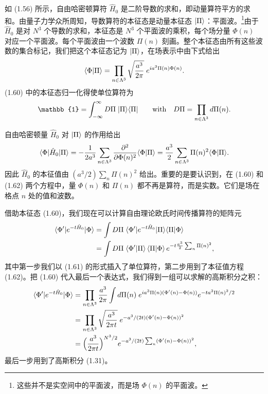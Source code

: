 如 (1.56) 所示，自由哈密顿算符 $\hat{H}_0$ 是二阶导数的求和，即动量算符平方的求和。由量子力学众所周知，导数算符的本征态是动量本征态 $|\Pi\rangle$：平面波。\footnote{这些并不是实空间中的平面波，而是场 $\Phi(n)$ 的平面波。}由于 $\hat{H}_0$ 是对 $N^3$ 个导数的求和，本征态是 $N^3$ 个平面波的乘积，每个场分量 $\Phi(n)$ 对应一个平面波。每个平面波由一个波数 $\Pi(n)$ 刻画。整个本征态由所有这些波数的集合标记，我们把这个本征态记为 $|\Pi\rangle$，在场表示中由下式给出
\begin{equation}
  \langle\Phi|\Pi\rangle
  = \prod_{n\in\Lambda^3}\sqrt{\frac{a^3}{2\pi}}\;e^{i a^3\Pi(n)\Phi(n)}.
\end{equation}
(1.60) 中的本征态归一化得使单位算符为
\begin{equation}
  \mathbb{1} = \int_{-\infty}^{\infty}D\Pi\;\ket{\Pi}\bra{\Pi}
  \qquad \text{with} \quad D\Pi = \prod_{n\in\Lambda^3}d\Pi(n).
\end{equation}

自由哈密顿量 $\hat{H}_0$ 对 $|\Pi\rangle$ 的作用给出
\begin{equation}
  \langle\Phi|\hat{H}_0|\Pi\rangle
  = -\frac{1}{2a^3}\sum_{n\in\Lambda^3}
    \frac{\partial^2}{\partial\Phi(n)^2}\langle\Phi|\Pi\rangle
  = \frac{a^3}{2}\sum_{n\in\Lambda^3}\Pi(n)^2\langle\Phi|\Pi\rangle.
\end{equation}
因此 $\hat{H}_0$ 的本征值由 $(a^3/2)\sum_n\Pi(n)^2$ 给出。重要的是要认识到，在 (1.60) 和 (1.62) 两个方程中，量 $\Phi(n)$ 和 $\Pi(n)$ 都不再是算符，而是实数。它们是场在格点 $n$ 处的值和波数。

借助本征态 (1.60)，我们现在可以计算自由理论欧氏时间传播算符的矩阵元
\begin{align}
  \langle\Phi'|e^{-t\hat{H}_0}|\Phi\rangle
  &= \int D\Pi\;\langle\Phi'|e^{-t\hat{H}_0}|\Pi\rangle\langle\Pi|\Phi\rangle \notag\\
  &= \int D\Pi\;\langle\Phi'|\Pi\rangle\,\langle\Pi|\Phi\rangle\,
     e^{-t\frac{a^3}{2}\sum_n \Pi(n)^2},
\end{align}
其中第一步我们以 (1.61) 的形式插入了单位算符，第二步用到了本征值方程 (1.62)。把 (1.60) 代入最后一个表达式，我们得到一组可以求解的高斯积分之积：
\begin{align}
  \langle\Phi'|e^{-t\hat{H}_0}|\Phi\rangle
  &= \prod_{n\in\Lambda^3}\frac{a^3}{2\pi}
     \int d\Pi(n)\;e^{i a^3\Pi(n)(\Phi'(n)-\Phi(n))}
     e^{-t a^3\Pi(n)^2/2} \notag\\
  &= \prod_{n\in\Lambda^3}\sqrt{\frac{a^3}{2\pi t}}\;
     e^{-a^3/(2t)(\Phi'(n)-\Phi(n))^2} \notag\\
  &= \Big(\frac{a^3}{2\pi t}\Big)^{N^3/2}
     e^{-a^3/(2t)\sum_n(\Phi'(n)-\Phi(n))^2},
\end{align}
最后一步用到了高斯积分 (1.31)。

